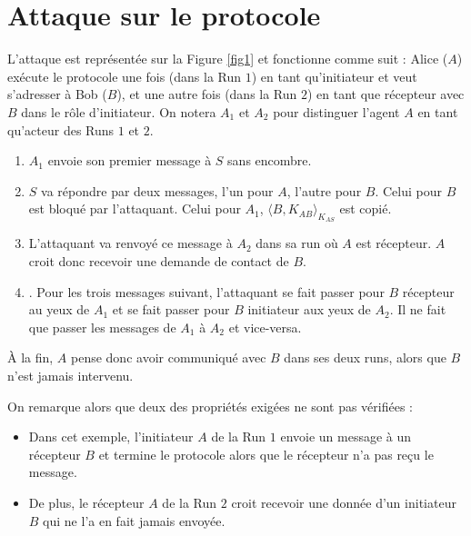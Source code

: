 \documentclass[a4paper,10pt]{article}
\begin{document}
\section{Attaque sur le protocole}
L'attaque est représentée sur la Figure \ref{fig1} et fonctionne comme suit : Alice ($A$) exécute le protocole une fois (dans la Run $1$) en tant qu'initiateur et veut s'adresser à Bob ($B$), et une autre fois (dans la Run $2$) en tant que récepteur avec $B$ dans le rôle d'initiateur. On notera $A_1$ et $A_2$ pour distinguer l'agent $A$ en tant qu'acteur des Runs $1$ et $2$.\\
\begin{enumerate}
\item $A_1$ envoie son premier message à $S$ sans encombre.
\item $S$ va répondre par deux messages, l'un pour $A$, l'autre pour $B$. Celui pour $B$ est bloqué par l'attaquant. Celui pour $A_1$, $\langle B, K_{AB} \rangle_{K_{AS}}$ est copié.
\item L'attaquant va renvoyé ce message à $A_2$ dans sa run où $A$ est récepteur. $A$ croit donc recevoir une demande de contact de $B$.
\item. Pour les trois messages suivant, l'attaquant se fait passer pour $B$ récepteur au yeux de $A_1$ et se fait passer pour $B$ initiateur aux yeux de $A_2$. Il ne fait que passer les messages de $A_1$ à $A_2$ et vice-versa.
\end{enumerate}
À la fin, $A$ pense donc avoir communiqué avec $B$ dans ses deux runs, alors que $B$ n'est jamais intervenu.

On remarque alors que deux des propriétés exigées ne sont pas vérifiées :
\begin{itemize}
\item Dans cet exemple, l'initiateur $A$ de la Run $1$ envoie un message à un récepteur $B$ et termine le protocole alors que le récepteur n'a pas reçu le message.
\item De plus, le récepteur $A$ de la Run $2$ croit recevoir une donnée d'un initiateur $B$ qui ne l'a en fait jamais envoyée.
\end{itemize}



\end{document}
